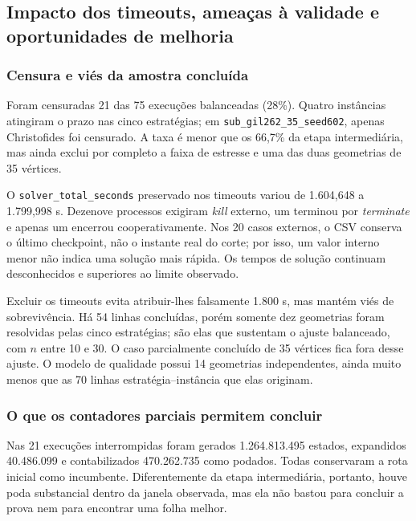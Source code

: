 \documentclass[12pt]{article}
\begin{document}
\subsection{Impacto dos timeouts, ameaças à validade e oportunidades de melhoria}

\subsubsection{Censura e viés da amostra concluída}

Foram censuradas 21 das 75 execuções balanceadas (28\%). Quatro instâncias
atingiram o prazo nas cinco estratégias; em
\texttt{sub\_gil262\_35\_seed602}, apenas Christofides foi censurado. A taxa é
menor que os 66,7\% da etapa intermediária, mas ainda exclui por completo a faixa de
estresse e uma das duas geometrias de 35 vértices.

O \texttt{solver\_total\_seconds} preservado nos timeouts variou de 1.604,648 a
1.799,998 s. Dezenove processos exigiram \textit{kill} externo, um terminou por
\textit{terminate} e apenas um encerrou cooperativamente. Nos 20 casos externos,
o CSV conserva o último checkpoint, não o instante real do corte; por isso, um
valor interno menor não indica uma solução mais rápida. Os tempos de solução
continuam desconhecidos e superiores ao limite observado.

Excluir os timeouts evita atribuir-lhes falsamente 1.800 s, mas mantém viés de
sobrevivência. Há 54 linhas concluídas, porém somente dez geometrias foram
resolvidas pelas cinco estratégias; são elas que sustentam o ajuste balanceado,
com $n$ entre 10 e 30. O caso parcialmente concluído de 35 vértices fica fora
desse ajuste. O modelo de qualidade possui 14 geometrias independentes, ainda
muito menos que as 70 linhas estratégia--instância que elas originam.

\subsubsection{O que os contadores parciais permitem concluir}

Nas 21 execuções interrompidas foram gerados 1.264.813.495 estados, expandidos
40.486.099 e contabilizados 470.262.735 como podados. Todas conservaram a rota
inicial como incumbente. Diferentemente da etapa intermediária, portanto, houve
poda substancial dentro da janela observada, mas ela não bastou para concluir a
prova nem para encontrar uma folha melhor.
\end{document}
